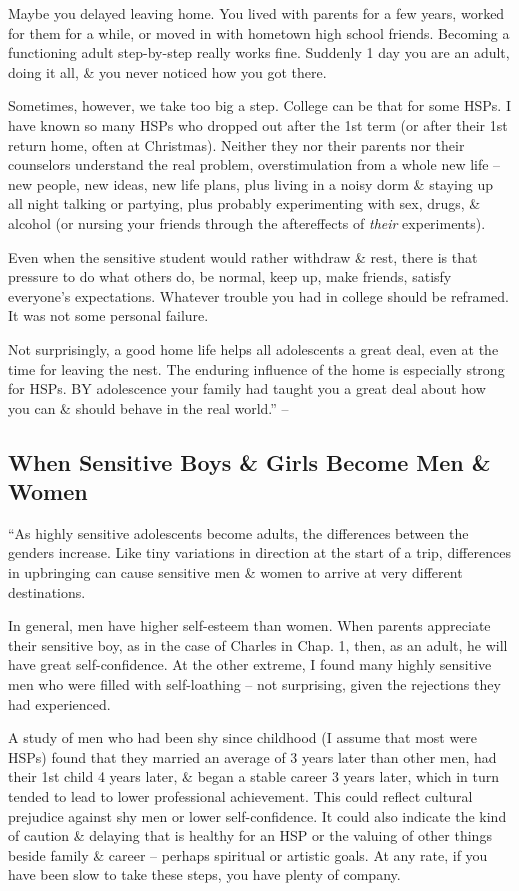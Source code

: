 \documentclass{article}
\numberwithin{equation}{section}
\begin{document}
Maybe you delayed leaving home. You lived with parents for a few years, worked for them for a while, or moved in with hometown high school friends. Becoming a functioning adult step-by-step really works fine. Suddenly 1 day you are an adult, doing it all, \& you never noticed how you got there.

Sometimes, however, we take too big a step. College can be that for some HSPs. I have known so many HSPs who dropped out after the 1st term (or after their 1st return home, often at Christmas). Neither they nor their parents nor their counselors understand the real problem, overstimulation from a whole new life -- new people, new ideas, new life plans, plus living in a noisy dorm \& staying up all night talking or partying, plus probably experimenting with sex, drugs, \& alcohol (or nursing your friends through the aftereffects of \textit{their} experiments).

Even when the sensitive student would rather withdraw \& rest, there is that pressure to do what others do, be normal, keep up, make friends, satisfy everyone's expectations. Whatever trouble you had in college should be reframed. It was not some personal failure.

Not surprisingly, a good home life helps all adolescents a great deal, even at the time for leaving the nest. The enduring influence of the home is especially strong for HSPs. BY adolescence your family had taught you a great deal about how you can \& should behave in the real world.'' -- \cite[pp. 116--118]{Aron2013}

\subsection{When Sensitive Boys \& Girls Become Men \& Women}
``As highly sensitive adolescents become adults, the differences between the genders increase. Like tiny variations in direction at the start of a trip, differences in upbringing can cause sensitive men \& women to arrive at very different destinations.

In general, men have higher self-esteem than women. When parents appreciate their sensitive boy, as in the case of Charles in Chap. 1, then, as an adult, he will have great self-confidence. At the other extreme, I found many highly sensitive men who were filled with self-loathing -- not surprising, given the rejections they had experienced.

A study of men who had been shy since childhood (I assume that most were HSPs) found that they married an average of 3 years later than other men, had their 1st child 4 years later, \& began a stable career 3 years later, which in turn tended to lead to lower professional achievement. This could reflect cultural prejudice against shy men or lower self-confidence. It could also indicate the kind of caution \& delaying that is healthy for an HSP or the valuing of other things beside family \& career -- perhaps spiritual or artistic goals. At any rate, if you have been slow to take these steps, you have plenty of company.
\end{document}
